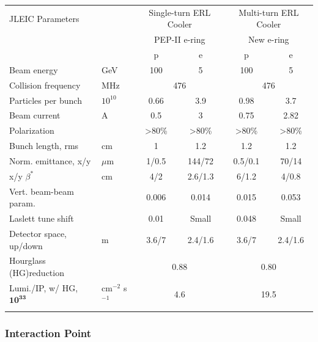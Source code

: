 \begin{center}
	\begin{tabular}{ l l c c c c } 
		JLEIC Parameters & & \multicolumn{2}{c}{Single-turn ERL Cooler} & \multicolumn{2}{c}{Multi-turn ERL Cooler}\\ 
		& & \multicolumn{2}{c}{PEP-II e-ring} & \multicolumn{2}{c}{New e-ring} \\
		\hline \hline
		& & p & e & p & e\\
		\hline
		Beam energy & GeV & 100 & 5 &100 &5 \\ 
		Collision frequency & MHz& \multicolumn{2}{c}{476} & \multicolumn{2}{c}{476}\\ 
		Particles per bunch & $10^10$ & 0.66 & 3.9& 0.98 & 3.7\\
		Beam current & A & 0.5 & 3 & 0.75 & 2.82\\
		Polarization &  & \textgreater80\% & \textgreater80\% & \textgreater80\% & \textgreater80\%\\
		Bunch length, rms & cm & 1 & 1.2 & 1.2 & 1.2 \\
		Norm. emittance, x/y& $\mu$m & 1/0.5 & 144/72 & 0.5/0.1 & 70/14 \\
		x/y $\beta^*$ & cm &4/2 & 2.6/1.3 & 6/1.2 & 4/0.8\\
		Vert. beam-beam param.& & 0.006 & 0.014 & 0.015 & 0.053\\
		Laslett tune shift & & 0.01 & Small & 0.048 & Small\\
		Detector space, up/down & m & 3.6/7 & 2.4/1.6 & 3.6/7 & 2.4/1.6\\
		Hourglass (HG)reduction & & \multicolumn{2}{c}{0.88} & \multicolumn{2}{c}{0.80}\\
		Lumi./IP, w/ HG, $\mathbf{10^{33}}$ & cm$^{-2}$ s$^{-1}$ & \multicolumn{2}{c}{4.6} & \multicolumn{2}{c}{19.5} \\
		\hline
		\label{table:parameters}
	\end{tabular}
\end{center}

\subsubsection{Interaction Point}

